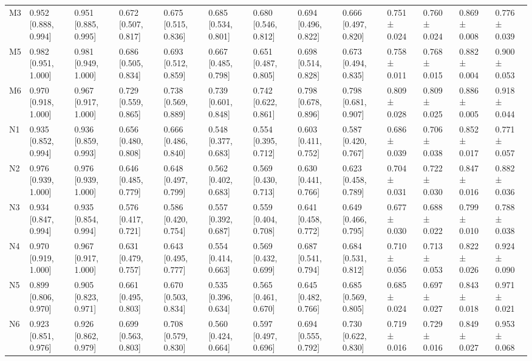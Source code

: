 \begin{table}
\begin{tabular}{lllllllllllll}
M3 & 0.952 [0.888, 0.994] & 0.951 [0.885, 0.995] & 0.672 [0.507, 0.817] & 0.675 [0.515, 0.836] & 0.685 [0.534, 0.801] & 0.680 [0.546, 0.812] & 0.694 [0.496, 0.822] & 0.666 [0.497, 0.820] & 0.751 ± 0.024 & 0.760 ± 0.024 & 0.869 ± 0.008 & 0.776 ± 0.039 \\
M5 & 0.982 [0.951, 1.000] & 0.981 [0.949, 1.000] & 0.686 [0.505, 0.834] & 0.693 [0.512, 0.859] & 0.667 [0.485, 0.798] & 0.651 [0.487, 0.805] & 0.698 [0.514, 0.828] & 0.673 [0.494, 0.835] & 0.758 ± 0.011 & 0.768 ± 0.015 & 0.882 ± 0.004 & 0.900 ± 0.053 \\
M6 & 0.970 [0.918, 1.000] & 0.967 [0.917, 1.000] & 0.729 [0.559, 0.865] & 0.738 [0.569, 0.889] & 0.739 [0.601, 0.848] & 0.742 [0.622, 0.861] & 0.798 [0.678, 0.896] & 0.798 [0.681, 0.907] & 0.809 ± 0.028 & 0.809 ± 0.025 & 0.886 ± 0.005 & 0.918 ± 0.044 \\
N1 & 0.935 [0.852, 0.994] & 0.936 [0.859, 0.993] & 0.656 [0.480, 0.808] & 0.666 [0.486, 0.840] & 0.548 [0.377, 0.683] & 0.554 [0.395, 0.712] & 0.603 [0.411, 0.752] & 0.587 [0.420, 0.767] & 0.686 ± 0.039 & 0.706 ± 0.038 & 0.852 ± 0.017 & 0.771 ± 0.057 \\
N2 & 0.976 [0.939, 1.000] & 0.976 [0.939, 1.000] & 0.646 [0.485, 0.779] & 0.648 [0.497, 0.799] & 0.562 [0.402, 0.683] & 0.569 [0.430, 0.713] & 0.630 [0.441, 0.766] & 0.623 [0.458, 0.789] & 0.704 ± 0.031 & 0.722 ± 0.030 & 0.847 ± 0.016 & 0.882 ± 0.036 \\
N3 & 0.934 [0.847, 0.994] & 0.935 [0.854, 0.994] & 0.576 [0.417, 0.721] & 0.586 [0.420, 0.754] & 0.557 [0.392, 0.687] & 0.559 [0.404, 0.708] & 0.641 [0.458, 0.772] & 0.649 [0.466, 0.795] & 0.677 ± 0.030 & 0.688 ± 0.022 & 0.799 ± 0.010 & 0.788 ± 0.038 \\
N4 & 0.970 [0.919, 1.000] & 0.967 [0.917, 1.000] & 0.631 [0.479, 0.757] & 0.643 [0.495, 0.777] & 0.554 [0.414, 0.663] & 0.569 [0.432, 0.699] & 0.687 [0.541, 0.794] & 0.684 [0.531, 0.812] & 0.710 ± 0.056 & 0.713 ± 0.053 & 0.822 ± 0.026 & 0.924 ± 0.090 \\
N5 & 0.899 [0.806, 0.970] & 0.905 [0.823, 0.971] & 0.661 [0.495, 0.803] & 0.670 [0.503, 0.834] & 0.535 [0.396, 0.634] & 0.565 [0.461, 0.670] & 0.645 [0.482, 0.766] & 0.685 [0.569, 0.805] & 0.685 ± 0.024 & 0.697 ± 0.027 & 0.843 ± 0.018 & 0.971 ± 0.021 \\
N6 & 0.923 [0.851, 0.976] & 0.926 [0.862, 0.979] & 0.699 [0.563, 0.803] & 0.708 [0.579, 0.830] & 0.560 [0.424, 0.664] & 0.597 [0.497, 0.696] & 0.694 [0.555, 0.792] & 0.730 [0.622, 0.830] & 0.719 ± 0.016 & 0.729 ± 0.016 & 0.849 ± 0.027 & 0.953 ± 0.068 \\

\end{tabular}
\end{table}
